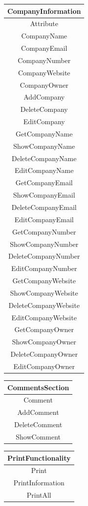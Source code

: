 \begin{center}
\begin{tabular}{ |c| }
\hline
\textbf{CompanyInformation}\\
\hline
Attribute\\
CompanyName\\
CompanyEmail\\
CompanyNumber\\
CompanyWebsite\\
CompanyOwner\\
\hline
AddCompany\\
DeleteCompany\\
EditCompany\\
GetCompanyName\\
ShowCompanyName\\
DeleteCompanyName\\
EditCompanyName\\
GetCompanyEmail\\
ShowCompanyEmail\\
DeleteCompanyEmail\\
EditCompanyEmail\\
GetCompanyNumber\\
ShowCompanyNumber\\
DeleteCompanyNumber\\
EditCompanyNumber\\
GetCompanyWebsite\\
ShowCompanyWebsite\\
DeleteCompanyWebsite\\
EditCompanyWebsite\\
GetCompanyOwner\\
ShowCompanyOwner\\
DeleteCompanyOwner\\
EditCompanyOwner\\
\hline
\end{tabular}
\end{center}
\begin{center}
\begin{tabular}{ |c| }
\hline
\textbf{CommentsSection}\\
\hline
Comment\\
\hline
AddComment\\
DeleteComment\\
ShowComment\\
\hline
\end{tabular}
\end{center}
\begin{center}
\begin{tabular}{ |c| }
\hline
\textbf{PrintFunctionality}\\
\hline
Print\\
\hline
PrintInformation\\
PrintAll\\
\hline
\end{tabular}
\end{center}

